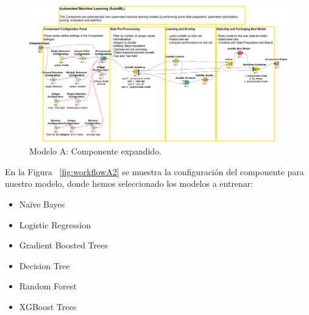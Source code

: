 \begin{figure}[!htb]
	\centering
	\includegraphics[width=1\textwidth]{img/workflowA3.png}
	\caption{Modelo A: Componente  expandido.}
	\label{fig:workflowA3}
\end{figure}
\FloatBarrier

En la Figura ~\ref{fig:workflowA2} se muestra la configuración del componente  para nuestro modelo, donde hemos seleccionado los 
modelos a entrenar: 

\begin{itemize}
	\item Naïve Bayes
	\item Logistic Regression
	\item Gradient Boosted Trees 
	\item Decision Tree 
	\item Random Forest 
	\item XGBoost Trees
\end{itemize}

